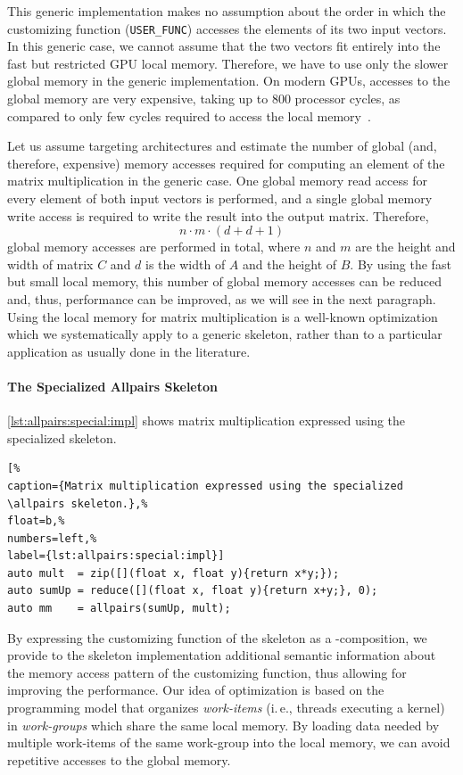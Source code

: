 This generic implementation makes no assumption about the order in which the customizing function (\texttt{USER\_FUNC}) accesses the elements of its two input vectors.
In this generic case, we cannot assume that the two vectors fit entirely into the fast but restricted GPU local memory.
Therefore, we have to use only the slower global memory in the generic implementation.
On modern GPUs, accesses to the global memory are very expensive, taking up to 800 processor cycles, as compared to only few cycles required to access the local memory~\cite{CUDAProgrammingGuide}.

Let us assume targeting \GPU architectures and estimate the number of global (and, therefore, expensive) memory accesses required for computing an element of the matrix multiplication in the generic case.
One global memory read access for every element of both input vectors is performed, and a single global memory write access is required to write the result into the output matrix.
Therefore,
\begin{equation}
  n\cdot m\cdot (d + d + 1)
  \label{eq:mm:accesses}
\end{equation}
global memory accesses are performed in total, where $n$ and $m$ are the height and width of matrix $C$ and $d$ is the width of $A$ and the height of $B$.
By using the fast but small local memory, this number of global memory accesses can be reduced and, thus, performance can be improved, as we will see in the next paragraph.
Using the local memory for matrix multiplication is a well-known optimization which we systematically apply to a generic skeleton, rather than to a particular application as usually done in the literature.

\paragraph{The Specialized Allpairs Skeleton}
\autoref{lst:allpairs:special:impl} shows matrix multiplication expressed using the specialized \allpairs skeleton.
\begin{lstlisting}[%
caption={Matrix multiplication expressed using the specialized \allpairs skeleton.},%
float=b,%
numbers=left,%
label={lst:allpairs:special:impl}]
auto mult  = zip([](float x, float y){return x*y;});
auto sumUp = reduce([](float x, float y){return x+y;}, 0);
auto mm    = allpairs(sumUp, mult);
\end{lstlisting}
%
By expressing the customizing function of the \allpairs skeleton as a \zip-\reduce composition, we provide to the skeleton implementation additional semantic information about the memory access pattern of the customizing function, thus allowing for improving the performance.
Our idea of optimization is based on the \OpenCL programming model that organizes \emph{work-items} (i.\,e., threads executing a kernel) in \emph{work-groups} which share the same \GPU local memory.
By loading data needed by multiple work-items of the same work-group into the local memory, we can avoid repetitive accesses to the global memory.


